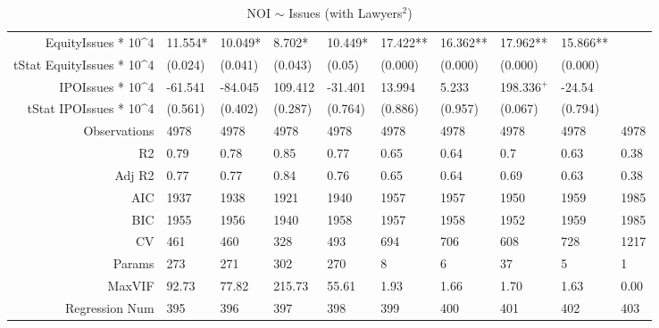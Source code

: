 \begin{table}[ht]
\begin{tabular}{rlllllllll}
  EquityIssues * 10^4 & 11.554* & 10.049* & 8.702* & 10.449* & 17.422** & 16.362** & 17.962** & 15.866** &  \\ 
  tStat EquityIssues * 10^4 & (0.024) & (0.041) & (0.043) & (0.05) & (0.000) & (0.000) & (0.000) & (0.000) &  \\ 
  IPOIssues * 10^4 & -61.541 & -84.045 & 109.412 & -31.401 & 13.994 & 5.233 & 198.336$^{+}$ & -24.54 &  \\ 
  tStat IPOIssues * 10^4 & (0.561) & (0.402) & (0.287) & (0.764) & (0.886) & (0.957) & (0.067) & (0.794) &  \\ 
  Observations & 4978 & 4978 & 4978 & 4978 & 4978 & 4978 & 4978 & 4978 & 4978 \\ 
  R2 & 0.79 & 0.78 & 0.85 & 0.77 & 0.65 & 0.64 & 0.7 & 0.63 & 0.38 \\ 
  Adj R2 & 0.77 & 0.77 & 0.84 & 0.76 & 0.65 & 0.64 & 0.69 & 0.63 & 0.38 \\ 
  AIC & 1937 & 1938 & 1921 & 1940 & 1957 & 1957 & 1950 & 1959 & 1985 \\ 
  BIC & 1955 & 1956 & 1940 & 1958 & 1957 & 1958 & 1952 & 1959 & 1985 \\ 
  CV & 461 & 460 & 328 & 493 & 694 & 706 & 608 & 728 & 1217 \\ 
  Params & 273 & 271 & 302 & 270 & 8 & 6 & 37 & 5 & 1 \\ 
  MaxVIF & 92.73 & 77.82 & 215.73 & 55.61 & 1.93 & 1.66 & 1.70 & 1.63 & 0.00 \\ 
  Regression Num & 395 & 396 & 397 & 398 & 399 & 400 & 401 & 402 & 403 \\ 
   \hline
\end{tabular}
\caption{NOI $\sim$ Issues (with Lawyers$^2$)} 
\end{table}
